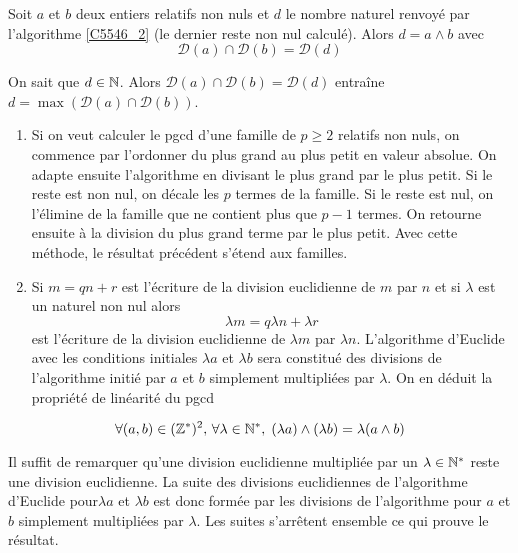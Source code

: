 \begin{propn}\label{pgcd}
  Soit $a$ et $b$ deux entiers relatifs non nuls et $d$ le nombre naturel renvoyé par l'algorithme \ref{C5546_2} (le dernier reste non nul calculé). Alors $d = a\wedge b$ avec
\begin{displaymath}
  \mathcal{D}(a)\cap \mathcal{D}(b) = \mathcal{D}(d)
\end{displaymath}
\end{propn}
\begin{demo}
  On sait que $d\in \mathbb{N}$. Alors $\mathcal{D}(a)\cap \mathcal{D}(b) = \mathcal{D}(d)$ entraîne $d = \max\left( \mathcal{D}(a)\cap \mathcal{D}(b)\right)$.
\end{demo}
\begin{rems}
\begin{enumerate}
  \item Si on veut calculer le pgcd d'une famille de $p\geq2$ relatifs non nuls, on commence par l'ordonner du plus grand au plus petit en valeur absolue. On adapte ensuite l'algorithme en divisant le plus grand par le plus petit. Si le reste est non nul, on décale les $p$ termes de la famille. Si le reste est nul, on l'élimine de la famille que ne contient plus que $p-1$ termes. On retourne ensuite à la division du plus grand terme par le plus petit. Avec cette méthode, le résultat précédent s'étend aux familles.
  \item Si $m = qn +r$ est l'écriture de la division euclidienne de $m$ par $n$ et si $\lambda$ est un naturel non nul alors 
  \begin{displaymath}
    \lambda m = q \lambda n + \lambda r
  \end{displaymath}
est l'écriture de la division euclidienne de $\lambda m$ par $\lambda n$. L'algorithme d'Euclide avec les conditions initiales $\lambda a$ et $\lambda b$ sera constitué des divisions de l'algorithme initié par $a$ et $b$ simplement multipliées par $\lambda$. On en déduit la propriété de linéarité du pgcd
\end{enumerate}
 \end{rems}
\begin{propn}
  \begin{displaymath}
    \forall (a,b)\in (\mathbb{Z}^*)^2,\, \forall \lambda \in \mathbb{N}^*, \; (\lambda a)\wedge (\lambda b) = \lambda (a\wedge b)
  \end{displaymath}
\end{propn}
\begin{demo}
  Il suffit de remarquer qu'une division euclidienne multipliée par un $\lambda \in \mathbb{N}^*$ reste une division euclidienne. La suite des divisions euclidiennes de l'algorithme d'Euclide pour$\lambda a$ et $\lambda b$ est donc formée par les divisions de l'algorithme pour $a$ et $b$ simplement multipliées par $\lambda$. Les suites s'arrêtent ensemble ce qui prouve le résultat.
\end{demo}

